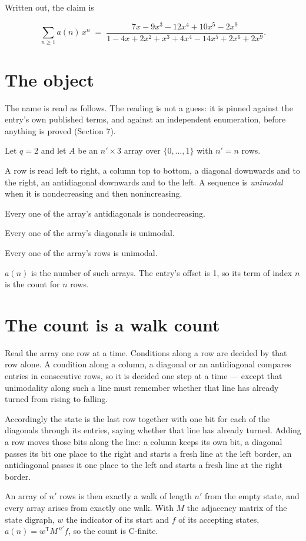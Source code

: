 \documentclass[11pt]{article}
\theoremstyle{definition}
\begin{document}
Written out, the claim is

\[\sum_{n \ge 1} a(n)\,x^n \;=\; \frac{7x - 9x^{3} - 12x^{4} + 10x^{5} - 2x^{9}}{1 - 4x + 2x^{2} + x^{3} + 4x^{4} - 14x^{5} + 2x^{6} + 2x^{9}}.\]

\section{The object}

The name is read as follows. The reading is not a guess: it is pinned against the entry's own published terms, and against an independent enumeration, before anything is proved (Section 7).

Let $q = 2$ and let $A$ be an $n' \times 3$ array over $\{0,\dots,1\}$ with $n' = n$ rows.

A row is read left to right, a column top to bottom, a diagonal downwards and to the right, an antidiagonal downwards and to the left. A sequence is {\itshape unimodal} when it is nondecreasing and then nonincreasing.

Every one of the array's antidiagonals is nondecreasing.

Every one of the array's diagonals is unimodal.

Every one of the array's rows is unimodal.

$a(n)$ is the number of such arrays. The entry's offset is 1, so its term of index $n$ is the count for $n$ rows.

\section{The count is a walk count}

Read the array one row at a time. Conditions along a row are decided by that row alone. A condition along a column, a diagonal or an antidiagonal compares entries in consecutive rows, so it is decided one step at a time --- except that unimodality along such a line must remember whether that line has already turned from rising to falling.

Accordingly the state is the last row together with one bit for each of the diagonals through its entries, saying whether that line has already turned. Adding a row moves those bits along the line: a column keeps its own bit, a diagonal passes its bit one place to the right and starts a fresh line at the left border, an antidiagonal passes it one place to the left and starts a fresh line at the right border.

An array of $n'$ rows is then exactly a walk of length $n'$ from the empty state, and every array arises from exactly one walk. With $M$ the adjacency matrix of the state digraph, $w$ the indicator of its start and $f$ of its accepting states, $a(n) = w^{\mathsf T}M^{\,n'}f$, so the count is C-finite.
\end{document}
